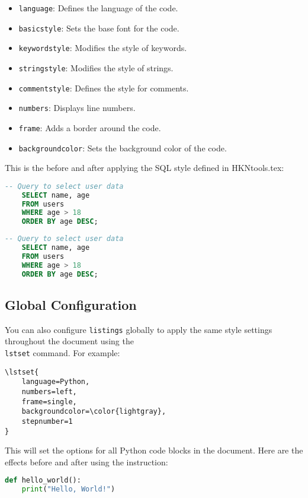 \begin{itemize}
    \item \texttt{language}: Defines the language of the code.
    \item \texttt{basicstyle}: Sets the base font for the code.
    \item \texttt{keywordstyle}: Modifies the style of keywords.
    \item \texttt{stringstyle}: Modifies the style of strings.
    \item \texttt{commentstyle}: Defines the style for comments.
    \item \texttt{numbers}: Displays line numbers.
    \item \texttt{frame}: Adds a border around the code.
    \item \texttt{backgroundcolor}: Sets the background color of the code.
\end{itemize}

This is the before and after applying the SQL style defined in HKNtools.tex:

\begin{lstlisting}[language=SQL]
    -- Query to select user data
    SELECT name, age
    FROM users
    WHERE age > 18
    ORDER BY age DESC;
\end{lstlisting}

\begin{lstlisting}[language=SQL, style=hkn]
    -- Query to select user data
    SELECT name, age
    FROM users
    WHERE age > 18
    ORDER BY age DESC;
\end{lstlisting}

\subsection{Global Configuration}

You can also configure \texttt{listings} globally to apply the same style settings throughout the document using the \texttt{\\lstset} command. For example:

\begin{lstlisting}
\lstset{
    language=Python,
    numbers=left,
    frame=single,
    backgroundcolor=\color{lightgray},
    stepnumber=1
}
\end{lstlisting}

This will set the options for all Python code blocks in the document.
Here are the effects before and after using the instruction:

\begin{lstlisting}[language=Python]
    def hello_world():
    print("Hello, World!")
\end{lstlisting}

